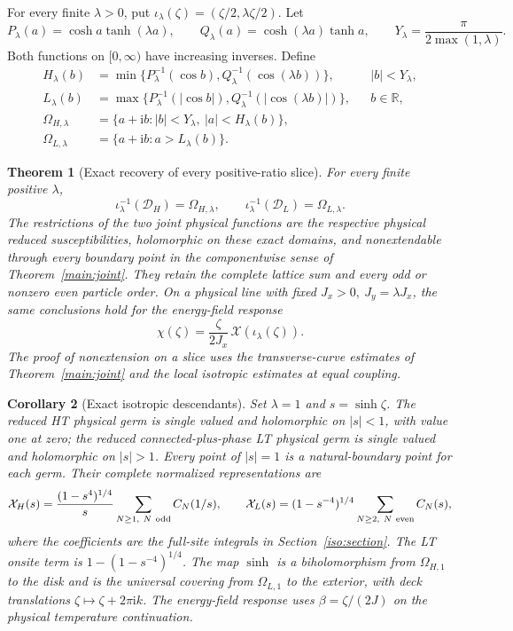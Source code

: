 \documentclass[11pt]{article}
\numberwithin{equation}{section}
\newtheorem{theorem}{Theorem}[section]
\newtheorem{corollary}[theorem]{Corollary}
\theoremstyle{definition}
\newcommand{\R}{\mathbb R}
\newcommand{\ii}{\mathrm i}
\renewcommand{\DH}{\mathcal D_H}
\newcommand{\DL}{\mathcal D_L}
\newcommand{\XH}{\mathcal X_H}
\newcommand{\XL}{\mathcal X_L}
\begin{document}
For every finite \(\lambda>0\), put
\(\iota_\lambda(\zeta)=(\zeta/2,\lambda\zeta/2)\). Let
\[
 P_\lambda(a)=\cosh a\tanh(\lambda a),\qquad
 Q_\lambda(a)=\cosh(\lambda a)\tanh a,\qquad
 Y_\lambda=\frac{\pi}{2\max(1,\lambda)}.
\]
Both functions on \([0,\infty)\) have increasing inverses. Define
\begin{align*}
 H_\lambda(b)&=\min\{P_\lambda^{-1}(\cos b),
                      Q_\lambda^{-1}(\cos(\lambda b))\},
                 &&|b|<Y_\lambda,\\
 L_\lambda(b)&=\max\{P_\lambda^{-1}(|\cos b|),
                      Q_\lambda^{-1}(|\cos(\lambda b)|)\},
                 &&b\in\R,\\
 \Omega_{H,\lambda}&=\{a+\ii b:|b|<Y_\lambda,\ |a|<H_\lambda(b)\},\\
 \Omega_{L,\lambda}&=\{a+\ii b:a>L_\lambda(b)\}.
\end{align*}

\begin{theorem}[Exact recovery of every positive-ratio slice]
\label{main:slices}
For every finite positive \(\lambda\),
\[
 \iota_\lambda^{-1}(\DH)=\Omega_{H,\lambda},\qquad
 \iota_\lambda^{-1}(\DL)=\Omega_{L,\lambda}.
\]
The restrictions of the two joint physical functions are the respective
physical reduced susceptibilities, holomorphic on these exact domains,
and nonextendable through every boundary point in the componentwise
sense of Theorem~\ref{main:joint}. They retain the complete lattice
sum and every odd or nonzero even particle order. On a physical line
with fixed \(J_x>0,\ J_y=\lambda J_x\), the same conclusions hold
for the energy-field response
\[
       \chi(\zeta)=\frac{\zeta}{2J_x}\,
                         \mathcal X(\iota_\lambda(\zeta)).
\]
The proof of nonextension on a slice uses the transverse-curve
estimates of Theorem~\ref{main:joint} and the local isotropic
estimates at equal coupling.
\end{theorem}

\begin{corollary}[Exact isotropic descendants]\label{main:isotropic}
Set \(\lambda=1\) and \(s=\sinh\zeta\).
The reduced HT physical germ is single valued and holomorphic on
\(|s|<1\), with value one at zero; the reduced connected-plus-phase
LT physical germ is single valued and holomorphic on \(|s|>1\).
Every point of \(|s|=1\) is a natural-boundary point for each germ.
Their complete normalized representations are
\[
 \XH(s)=\frac{(1-s^4)^{1/4}}{s}
                      \sum_{N\ge1,\ N\ {\rm odd}}C_N(1/s),\qquad
 \XL(s)=(1-s^{-4})^{1/4}
                      \sum_{N\ge2,\ N\ {\rm even}}C_N(s),
\]
where the coefficients are the full-site integrals in
Section~\ref{iso:section}. The LT onsite term is
\(1-(1-s^{-4})^{1/4}\).
The map \(\sinh\) is a biholomorphism from \(\Omega_{H,1}\)
to the disk and is the universal covering from \(\Omega_{L,1}\)
to the exterior, with deck translations \(\zeta\mapsto\zeta+2\pi\ii k\).
The energy-field response uses \(\beta=\zeta/(2J)\) on the physical
temperature continuation.
\end{corollary}
\end{document}
